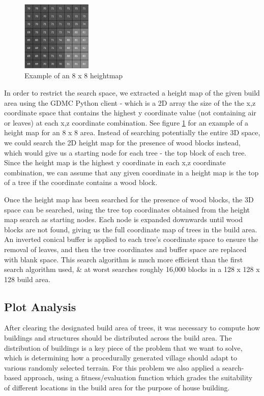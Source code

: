\documentclass[11pt, oneside]{article}
\begin{document}
\begin{normalsize}
\begin{figure}[H]
\centering
\includegraphics[width=0.3\textwidth]{height}
\caption{Example of an 8 x 8 heightmap \cite{esko2021multi}}
\label{fig:height}
\end{figure}

In order to restrict the search space, we extracted a height map of the given build area using the GDMC Python client - which is a 2D array the size of the the x,z coordinate space that contains the highest y coordinate value (not containing air or leaves) at each x,z coordinate combination. See figure \ref{fig:height} for an example of a height map for an 8 x 8 area. Instead of searching potentially the entire 3D space, we could search the 2D height map for the presence of wood blocks instead, which would give us a starting node for each tree - the top block of each tree. Since the height map is the highest y coordinate in each x,z coordinate combination, we can assume that any given coordinate in a height map is the top of a tree if the coordinate contains a wood block.

Once the height map has been searched for the presence of wood blocks, the 3D space can be searched, using the tree top coordinates obtained from the height map search as starting nodes. Each node is expanded downwards until wood blocks are not found, giving us the full coordinate map of trees in the build area. An inverted conical buffer is applied to each tree's coordinate space to ensure the removal of leaves, and then the tree coordinates and buffer space are replaced with blank space. This search algorithm is much more efficient than the first search algorithm used, \& at worst searches roughly 16,000 blocks in a 128 x 128 x 128 build area.

\subsection{Plot Analysis}

After clearing the designated build area of trees, it was necessary to compute how buildings and structures should be distributed across the build area. The distribution of buildings is a key piece of the problem that we want to solve, which is determining how a procedurally generated village should adapt to various randomly selected terrain. For this problem we also applied a search-based approach, using a fitness/evaluation function which grades the suitability of different locations in the build area for the purpose of house building.


\end{normalsize}
\end{document}
